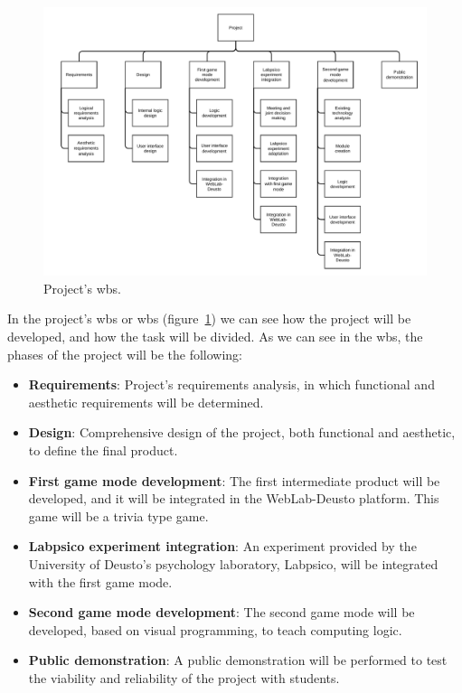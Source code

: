 \begin{figure}
	\centering
	\includegraphics[height=0.9\textwidth, angle=90]{fig/wbs}
	\caption{Project's \acrlong{wbs}.}\label{fig:wbs}
\end{figure}

In the project's \acrlong{wbs} or \acrshort{wbs} (figure~\ref{fig:wbs}) we can see how the project
will be developed, and how the task will be divided. As we can see in the \acrshort{wbs}, the phases
of the project will be the following:

\begin{itemize}
\item \textbf{Requirements}: Project's requirements analysis, in which functional and aesthetic
requirements will be determined.

\item \textbf{Design}: Comprehensive design of the project, both functional and aesthetic, to define
the final product.

\item \textbf{First game mode development}: The first intermediate product will be developed, and it
will be integrated in the WebLab-Deusto platform. This game will be a trivia type game.

\item \textbf{Labpsico experiment integration}: An experiment provided by the University of Deusto's
psychology laboratory, Labpsico, will be integrated with the first game mode.

\item \textbf{Second game mode development}: The second game mode will be developed, based on visual
programming, to teach computing logic.

\item \textbf{Public demonstration}: A public demonstration will be performed to test the viability
and reliability of the project with students.
\end{itemize}

